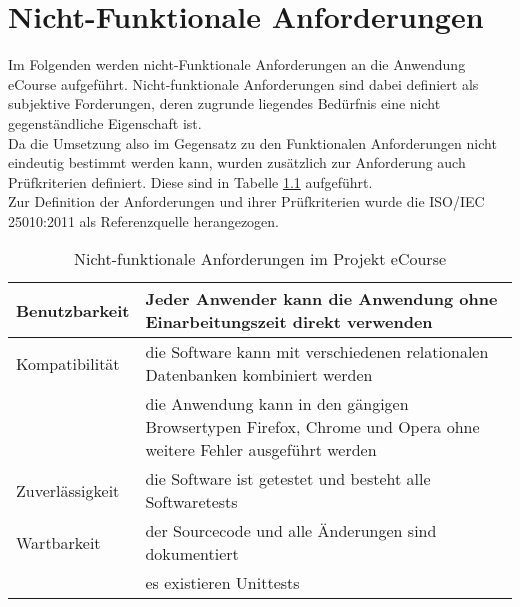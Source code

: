 \chapter{Nicht-Funktionale Anforderungen}
\label{sec:nicht_funktionale_Anforderungen}
Im Folgenden werden nicht-Funktionale Anforderungen an die Anwendung eCourse aufgeführt. Nicht-funktionale Anforderungen sind dabei definiert als subjektive Forderungen, deren zugrunde liegendes Bedürfnis eine nicht gegenständliche Eigenschaft ist. \\
Da die Umsetzung also im Gegensatz zu den Funktionalen Anforderungen nicht eindeutig bestimmt werden kann, wurden zusätzlich zur Anforderung auch Prüfkriterien definiert. Diese sind in Tabelle \ref{tab:nicht-funktionale_Anforderungen} aufgeführt. \\
Zur Definition der Anforderungen und ihrer Prüfkriterien wurde die ISO/IEC 25010:2011 als Referenzquelle herangezogen.

\begin{table}
\centering
	\begin{tabularx}{\textwidth}[H]{|X|X|}
		\hline
		Benutzbarkeit & Jeder Anwender kann die Anwendung ohne Einarbeitungszeit direkt verwenden \\
		\hline 
		Kompatibilität & die Software kann mit verschiedenen relationalen Datenbanken kombiniert werden \\
		\hline 
		\quad & die Anwendung kann in den gängigen Browsertypen Firefox, Chrome und Opera ohne weitere Fehler ausgeführt werden \\
		\hline
		Zuverlässigkeit & die Software ist getestet und besteht alle Softwaretests\\
		\hline
		Wartbarkeit & der Sourcecode und alle Änderungen sind dokumentiert \\
		\hline
		\quad & es existieren Unittests \\
		\hline
	\end{tabularx}
\caption{Nicht-funktionale Anforderungen im Projekt eCourse}
\label{tab:nicht-funktionale_Anforderungen}
\end{table}